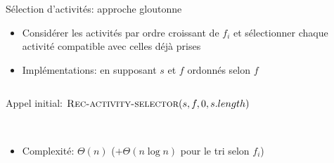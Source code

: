 \begin{frame}{Sélection d'activités: approche gloutonne}
\begin{itemize}
\item Considérer les activités par ordre croissant de $f_i$ et sélectionner chaque activité compatible avec celles déjà prises
\item Implémentations: en supposant $s$ et $f$ ordonnés selon $f$
\end{itemize}

\begin{columns}
\begin{column}{6cm}
{\scriptsize
\begin{center}
\end{center}
Appel initial: $\textnormal{\scshape Rec-activity-selector}(s,f,0,s.length)$
}
\end{column}
\begin{column}{4cm}
{\scriptsize
\begin{center}
\end{center}
~\\
~\\
}
\end{column}
\end{columns}

\bigskip

\begin{itemize}
\item Complexité: $\Theta(n)$ ($+\Theta(n\log n)$ pour le tri selon $f_i$)
\end{itemize}

\end{frame}

